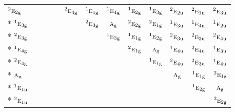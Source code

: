 \documentclass[10pt,a4paper]{article}
\numberwithin{equation}{section}
\newcommand{\irr}[1]{\text{\normalfont\scshape #1}}
\newcommand{\conjpair}[1]{{}^{#1}}
\newcommand{\ptag}[1]{\mathrm{#1}}
\begin{document}
{\begin{longtable}{@{}lcccccccccccc@{}}
$\conjpair{2}\irr{e}_{2\ptag{g}}$ &  &  &  &  & $\conjpair{2}\irr{e}_{4\ptag{g}}$ & $\conjpair{1}\irr{e}_{1\ptag{g}}$ & $\conjpair{1}\irr{e}_{4\ptag{g}}$ & $\conjpair{1}\irr{e}_{2\ptag{g}}$ & $\conjpair{1}\irr{e}_{3\ptag{g}}$ & $\conjpair{2}\irr{e}_{2\ptag{u}}$ & $\conjpair{2}\irr{e}_{1\ptag{u}}$ & $\conjpair{2}\irr{e}_{3\ptag{u}}$\\*
$\conjpair{1}\irr{e}_{3\ptag{g}}$ &  &  &  &  &  & $\conjpair{2}\irr{e}_{3\ptag{g}}$ & $\irr{a}_{\ptag{g}}$ & $\conjpair{2}\irr{e}_{2\ptag{g}}$ & $\conjpair{2}\irr{e}_{1\ptag{g}}$ & $\conjpair{1}\irr{e}_{3\ptag{u}}$ & $\conjpair{1}\irr{e}_{4\ptag{u}}$ & $\conjpair{1}\irr{e}_{2\ptag{u}}$\\*
$\conjpair{2}\irr{e}_{3\ptag{g}}$ &  &  &  &  &  &  & $\conjpair{1}\irr{e}_{3\ptag{g}}$ & $\conjpair{1}\irr{e}_{1\ptag{g}}$ & $\conjpair{1}\irr{e}_{2\ptag{g}}$ & $\conjpair{2}\irr{e}_{3\ptag{u}}$ & $\conjpair{2}\irr{e}_{2\ptag{u}}$ & $\conjpair{2}\irr{e}_{4\ptag{u}}$\\*
$\conjpair{1}\irr{e}_{4\ptag{g}}$ &  &  &  &  &  &  &  & $\conjpair{2}\irr{e}_{1\ptag{g}}$ & $\irr{a}_{\ptag{g}}$ & $\conjpair{1}\irr{e}_{4\ptag{u}}$ & $\conjpair{2}\irr{e}_{4\ptag{u}}$ & $\conjpair{1}\irr{e}_{3\ptag{u}}$\\*
$\conjpair{2}\irr{e}_{4\ptag{g}}$ &  &  &  &  &  &  &  &  & $\conjpair{1}\irr{e}_{1\ptag{g}}$ & $\conjpair{2}\irr{e}_{4\ptag{u}}$ & $\conjpair{2}\irr{e}_{3\ptag{u}}$ & $\conjpair{1}\irr{e}_{4\ptag{u}}$\\*
$\irr{a}_{\ptag{u}}$ &  &  &  &  &  &  &  &  &  & $\irr{a}_{\ptag{g}}$ & $\conjpair{1}\irr{e}_{1\ptag{g}}$ & $\conjpair{2}\irr{e}_{1\ptag{g}}$\\*
$\conjpair{1}\irr{e}_{1\ptag{u}}$ &  &  &  &  &  &  &  &  &  &  & $\conjpair{1}\irr{e}_{2\ptag{g}}$ & $\irr{a}_{\ptag{g}}$\\*
$\conjpair{2}\irr{e}_{1\ptag{u}}$ &  &  &  &  &  &  &  &  &  &  &  & $\conjpair{2}\irr{e}_{2\ptag{g}}$\\
\bottomrule\end{longtable}}
\end{document}
